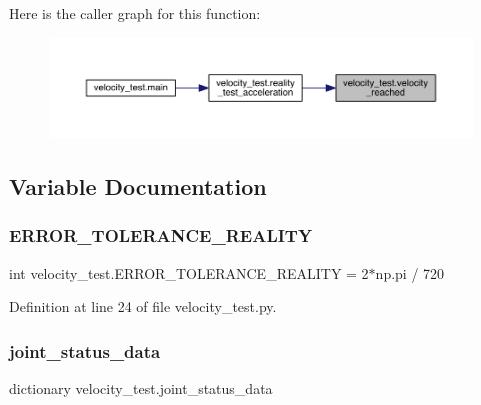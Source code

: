 Here is the caller graph for this function\+:\nopagebreak
\begin{figure}[H]
\begin{center}
\leavevmode
\includegraphics[width=350pt]{namespacevelocity__test_a125db86a88728cf91ab4383613e22cd1_icgraph}
\end{center}
\end{figure}


\subsection{Variable Documentation}
\mbox{\label{namespacevelocity__test_aff3865a893342d83613d51d6a735bffd}} 
\subsubsection{\texorpdfstring{ERROR\_TOLERANCE\_REALITY}{ERROR\_TOLERANCE\_REALITY}}
{\footnotesize\ttfamily int velocity\+\_\+test.\+E\+R\+R\+O\+R\+\_\+\+T\+O\+L\+E\+R\+A\+N\+C\+E\+\_\+\+R\+E\+A\+L\+I\+TY = 2$\ast$np.\+pi / 720}



Definition at line 24 of file velocity\+\_\+test.\+py.

\mbox{\label{namespacevelocity__test_adedb8acaa09e634a0127c67ad61a001b}} 
\subsubsection{\texorpdfstring{joint\_status\_data}{joint\_status\_data}}
{\footnotesize\ttfamily dictionary velocity\+\_\+test.\+joint\+\_\+status\+\_\+data}

